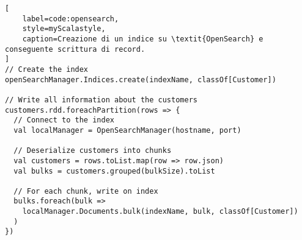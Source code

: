 \begin{lstlisting}[
    label=code:opensearch,
    style=myScalastyle,
    caption=Creazione di un indice su \textit{OpenSearch} e conseguente scrittura di record.
]
// Create the index
openSearchManager.Indices.create(indexName, classOf[Customer])

// Write all information about the customers
customers.rdd.foreachPartition(rows => {
  // Connect to the index
  val localManager = OpenSearchManager(hostname, port)

  // Deserialize customers into chunks
  val customers = rows.toList.map(row => row.json)
  val bulks = customers.grouped(bulkSize).toList

  // For each chunk, write on index
  bulks.foreach(bulk =>
    localManager.Documents.bulk(indexName, bulk, classOf[Customer])
  )
})
\end{lstlisting}